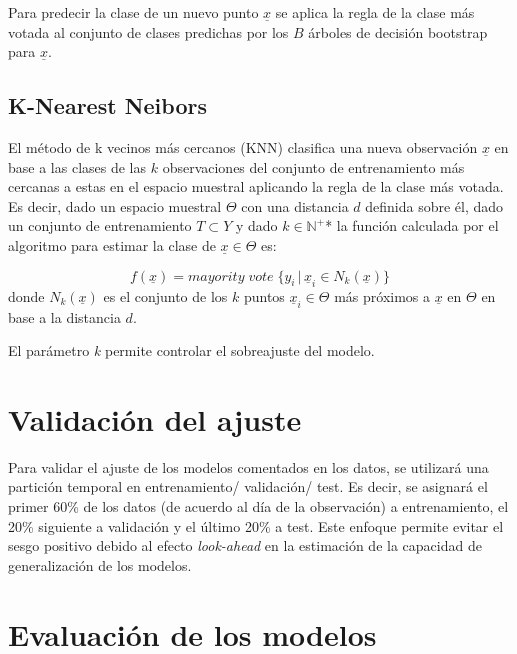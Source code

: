 \documentclass[12pt,a4paper,]{book}
\numberwithin{dummy}{section}
\theoremstyle{ocrenumbox}
\theoremstyle{blacknumex}
\theoremstyle{blacknumbox}
\theoremstyle{ocrenum}
\theoremstyle{ocrenum}
\begin{document}
Para predecir la clase de un nuevo punto \(\underline x\) se aplica la
regla de la clase más votada al conjunto de clases predichas por los
\(B\) árboles de decisión bootstrap para \(\underline x\).

\hypertarget{k-nearest-neibors}{%
\subsection{K-Nearest Neibors}\label{k-nearest-neibors}}

El método de k vecinos más cercanos (KNN) clasifica una nueva
observación \(\underline x\) en base a las clases de las \(k\)
observaciones del conjunto de entrenamiento más cercanas a estas en el
espacio muestral aplicando la regla de la clase más votada. Es decir,
dado un espacio muestral \(\Theta\) con una distancia \(d\) definida
sobre él, dado un conjunto de entrenamiento \(T \subset Y\) y dado
\(k \in \mathbb{N^+}\)* la función calculada por el algoritmo para
estimar la clase de \(\underline x \in \Theta\) es:

\[f(\underline x) = mayority\; vote\;\{ y_i \,| \, \underline x_i \in N_k(\underline x)\}\]
donde \(N_k(\underline x)\) es el conjunto de los \(k\) puntos
\(\underline x_i \in \Theta\) más próximos a \(\underline x\) en
\(\Theta\) en base a la distancia \(d\).

El parámetro \emph{k} permite controlar el sobreajuste del modelo.

\hypertarget{validaciuxf3n-del-ajuste}{%
\section{Validación del ajuste}\label{validaciuxf3n-del-ajuste}}

Para validar el ajuste de los modelos comentados en los datos, se
utilizará una partición temporal en entrenamiento/ validación/ test. Es
decir, se asignará el primer 60\% de los datos (de acuerdo al día de la
observación) a entrenamiento, el 20\% siguiente a validación y el último
20\% a test. Este enfoque permite evitar el sesgo positivo debido al
efecto \emph{look-ahead} en la estimación de la capacidad de
generalización de los modelos.

\hypertarget{evaluaciuxf3n-de-los-modelos}{%
\section{Evaluación de los modelos}\label{evaluaciuxf3n-de-los-modelos}}
\end{document}
